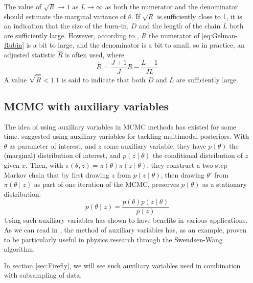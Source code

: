 The value of $\sqrt{R} \xrightarrow{} 1$ as $L \xrightarrow{} \infty$ as both the numerator and the denominator should estimate the marginal variance of $\theta$. If $\sqrt{R}$ is sufficiently close to 1, it is an indication that the size of the burn-in, $D$ and the length of the chain $L$ both are sufficiently large. However, according to \cite{CS}, $R$ the numerator of \eqref{eq:Gelman-Rubin} is a bit to large, and the denominator is a bit to small, so in practice, an adjusted statistic $\hat{R}$ is often used, where
\begin{equation}\label{eq:Gelman-Rubin_adjusted}
    \hat{R} = \frac{J+1}{J}R - \frac{L-1}{JL} 
\end{equation}
A value $\sqrt{\hat{R}}<1.1$ is said to indicate that both $D$ and $L$ are sufficiently large.

\subsection{MCMC with auxiliary variables}
The idea of using auxiliary variables in MCMC methods has existed for some time. 
\cite{Besag} suggested using auxiliary variables for tackling multimodal posteriors.
With $\theta$ as parameter of interest, and $z$ some auxiliary variable, they have $p\left(\theta\right)$ the (marginal) distribution of interest, and $p\left(z\mid\theta\right)$ the conditional distribution of $z$ given $x$. 
Then, with $\pi\left(\theta, z\right) = \pi\left(\theta\right)\pi\left(z\mid\theta\right)$, they construct a two-step Markov chain that by  
first drawing $z$ from $p\left(z\mid \theta\right)$, then drawing $\theta'$ from $\pi\left(\theta\mid z\right)$ as part of one iteration of the MCMC, preserves $p\left(\theta\right)$ as a stationary distribution. 
$$p\left(\theta\mid z\right) = \frac{p\left(\theta\right) p\left(z\mid\theta\right)}{p\left(z\right)}$$
Using such auxiliary variables has shown to have benefits in various applications. 
As we can read in \cite{Besag}, the method of auxiliary variables has, as an example, proven to be particularly useful in physics research through the Swendsen-Wang algorithm. 

In section \ref{sec:Firefly}, we will see such auxiliary variables used in combination with subsampling of data.
